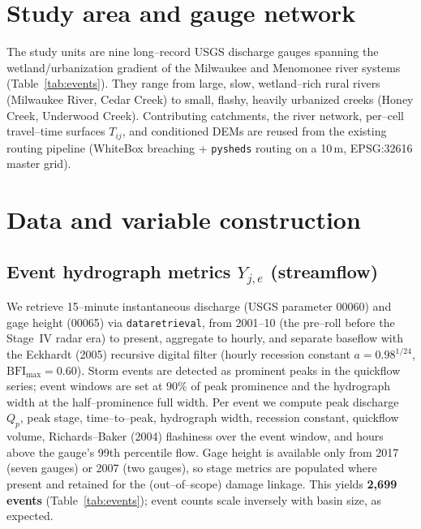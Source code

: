 \documentclass[11pt]{article}
\begin{document}
\section{Study area and gauge network}
The study units are nine long--record USGS discharge gauges spanning the wetland/urbanization
gradient of the Milwaukee and Menomonee river systems (Table~\ref{tab:events}). They range
from large, slow, wetland--rich rural rivers (Milwaukee River, Cedar Creek) to small, flashy,
heavily urbanized creeks (Honey Creek, Underwood Creek). Contributing catchments, the
river network, per--cell travel--time surfaces $T_{ij}$, and conditioned DEMs are reused from
the existing routing pipeline (WhiteBox breaching + \texttt{pysheds} routing on a 10\,m,
EPSG:32616 master grid).

\section{Data and variable construction}

\subsection{Event hydrograph metrics $Y_{j,e}$ (streamflow)}
We retrieve 15--minute instantaneous discharge (USGS parameter 00060) and gage height
(00065) via \texttt{dataretrieval}, from 2001--10 (the pre--roll before the Stage~IV radar
era) to present, aggregate to hourly, and separate baseflow with the Eckhardt (2005)
recursive digital filter (hourly recession constant $a=0.98^{1/24}$, $\mathrm{BFI}_{\max}=0.60$).
Storm events are detected as prominent peaks in the quickflow series; event windows are set
at $90\%$ of peak prominence and the hydrograph width at the half--prominence full width.
Per event we compute peak discharge $Q_p$, peak stage, time--to--peak, hydrograph width,
recession constant, quickflow volume, Richards--Baker (2004) flashiness over the event
window, and hours above the gauge's 99th percentile flow. Gage height is available only
from 2017 (seven gauges) or 2007 (two gauges), so stage metrics are populated where present
and retained for the (out--of--scope) damage linkage. This yields \textbf{2{,}699 events}
(Table~\ref{tab:events}); event counts scale inversely with basin size, as expected.
\end{document}
